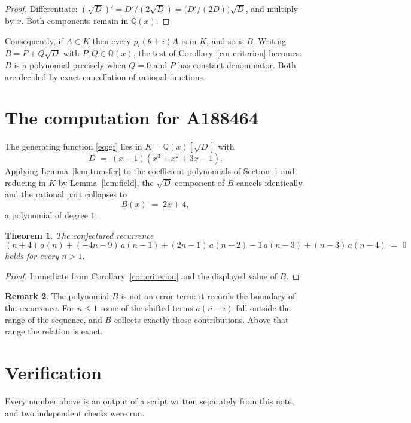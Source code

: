 \documentclass[11pt,a4paper]{article}
\theoremstyle{plain}
\newtheorem{theorem}{Theorem}
\theoremstyle{definition}
\newtheorem{remark}[theorem]{Remark}
\begin{document}
\begin{proof}
Differentiate: $(\sqrt{D})'=D'/(2\sqrt{D})=\bigl(D'/(2D)\bigr)\sqrt{D}$, and multiply by
$x$. Both components remain in $\mathbb{Q}(x)$.
\end{proof}

Consequently, if $A\in K$ then every $p_{i}(\theta+i)A$ is in $K$, and so is $B$. Writing
$B=P+Q\sqrt{D}$ with $P,Q\in\mathbb{Q}(x)$, the test of Corollary~\ref{cor:criterion}
becomes: $B$ is a polynomial precisely when $Q=0$ and $P$ has constant denominator. Both
are decided by exact cancellation of rational functions.

\section{The computation for A188464}

The generating function \eqref{eq:gf} lies in $K=\mathbb{Q}(x)[\sqrt{D}]$ with
\[
D \;=\; \left(x - 1\right) \left(x^{3} + x^{2} + 3 x - 1\right) .
\]
Applying Lemma~\ref{lem:transfer} to the coefficient polynomials of Section~1 and reducing
in $K$ by Lemma~\ref{lem:field}, the $\sqrt{D}$ component of $B$ cancels identically and
the rational part collapses to
\[
B(x)\;=\;2 x + 4 ,
\]
a polynomial of degree $1$.

\begin{theorem}
The conjectured recurrence
\[
(n + 4)\,a(n) + (- 4 n - 9)\,a(n-1) + (2 n - 1)\,a(n-2) - 1\,a(n-3) + (n - 3)\,a(n-4) \;=\;0
\]
holds for every $n>1$.
\end{theorem}

\begin{proof}
Immediate from Corollary~\ref{cor:criterion} and the displayed value of $B$.
\end{proof}

\begin{remark}
The polynomial $B$ is not an error term: it records the boundary of the recurrence. For
$n\le1$ some of the shifted terms $a(n-i)$ fall outside the range of the sequence,
and $B$ collects exactly those contributions. Above that range the relation is exact.
\end{remark}

\section{Verification}

Every number above is an output of a script written separately from this note, and two
independent checks were run.
\end{document}
